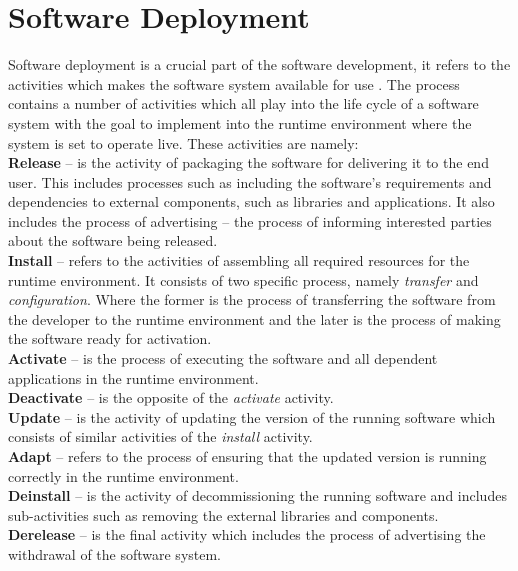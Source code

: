 \section{Software Deployment}

Software deployment is a crucial part of the software development, it refers to the activities which makes the software system available for use \cite{carzaniga1998characterization}. The process contains a number of activities which all play into the life cycle of a software system with the goal to implement into the runtime environment where the system is set to operate live. These activities are namely: \\

\textbf{Release} – is the activity of packaging the software for delivering it to the end user. This includes processes such as including the software's requirements and dependencies to external components, such as libraries and applications. It also includes the process of advertising – the process of informing interested parties about the software being released.\\
\textbf{Install} – refers to the activities of assembling all required resources for the runtime environment. It consists of two specific process, namely \textit{transfer} and \textit{configuration}. Where the former is the process of transferring the software from the developer to the runtime environment and the later is the process of making the software ready for activation.\\
\textbf{Activate} – is the process of executing the software and all dependent applications in the runtime environment.\\
\textbf{Deactivate} – is the opposite of the \textit{activate} activity.\\
\textbf{Update} – is the activity of updating the version of the running software which consists of similar activities of the \textit{install} activity.\\
\textbf{Adapt} – refers to the process of ensuring that the updated version is running correctly in the runtime environment.\\
\textbf{Deinstall} – is the activity of decommissioning the running software and includes sub-activities such as removing the external libraries and components.\\
\textbf{Derelease} – is the final activity which includes the process of advertising the withdrawal of the software system.\\

